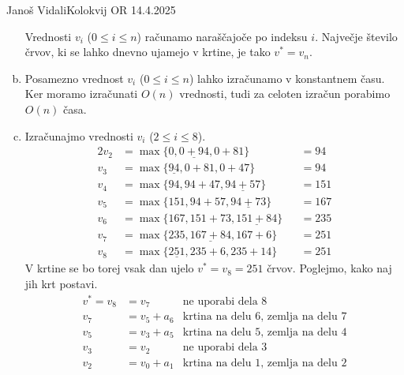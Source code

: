 \begin{naloga}{Janoš Vidali}{Kolokvij OR 14.4.2025}
\begin{odgovor}
\begin{enumerate}[(a)]
Vrednosti $v_i$ ($0 \le i \le n$) računamo naraščajoče po indeksu $i$.
Največje število črvov, ki se lahko dnevno ujamejo v krtine,
je tako $v^* = v_n$.

\item Posamezno vrednost $v_i$ ($0 \le i \le n$)
lahko izračunamo v konstantnem času.
Ker moramo izračunati $O(n)$ vrednosti,
tudi za celoten izračun porabimo $O(n)$ časa.

\item Izračunajmo vrednosti $v_i$ ($2 \le i \le 8$).
\begin{alignat*}{2}
v_2 &= \max\{0, \underline{0 + 94}, 0+ 81\} &&= 94 \\
v_3 &= \max\{\underline{94}, 0 + 81, 0 + 47\} &&= 94 \\
v_4 &= \max\{94, 94 + 47, \underline{94 + 57}\} &&= 151 \\
v_5 &= \max\{151, 94 + 57, \underline{94 + 73}\} &&= 167 \\
v_6 &= \max\{167, 151 + 73, \underline{151 + 84}\} &&= 235 \\
v_7 &= \max\{235, \underline{167 + 84}, 167 + 6\} &&= 251 \\
v_8 &= \max\{\underline{251}, 235 + 6, 235 + 14\} &&= 251
\end{alignat*}
V krtine se bo torej vsak dan ujelo $v^* = v_8 = 251$ črvov.
Poglejmo, kako naj jih krt postavi.
\begin{align*}
v^* = v_8 &= v_7 & \text{ne uporabi dela $8$} \\
v_7 &= v_5 + a_6 & \text{krtina na delu $6$, zemlja na delu $7$} \\
v_5 &= v_3 + a_5 & \text{krtina na delu $5$, zemlja na delu $4$} \\
v_3 &= v_2 & \text{ne uporabi dela $3$} \\
v_2 &= v_0 + a_1 & \text{krtina na delu $1$, zemlja na delu $2$}
\end{align*}
\end{enumerate}
\end{odgovor}
\end{naloga}

